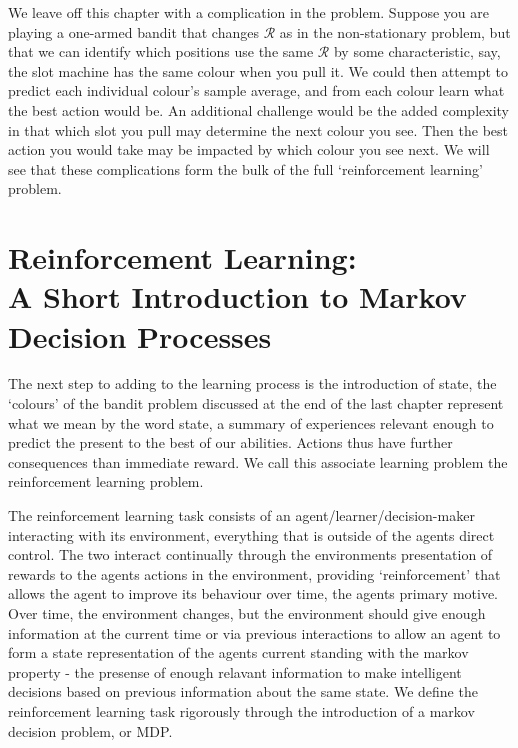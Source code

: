 We leave off this chapter with a complication in the problem. Suppose you are playing a one-armed bandit that changes $\mathcal{R}$ as in the non-stationary problem, but that we can identify which positions use the same $\mathcal{R}$ by some characteristic, say, the slot machine has the same colour when you pull it. We could then attempt to predict each individual colour's sample average, and from each colour learn what the best action would be. An additional challenge would be the added complexity in that which slot you pull may determine the next colour you see. Then the best action you would take may be impacted by which colour you see next. We will see that these complications form the bulk of the full `reinforcement learning' problem.

\chapter{Reinforcement Learning:\\A Short Introduction to Markov Decision Processes}

The next step to adding to the learning process is the introduction of state, the `colours' of the bandit problem discussed at the end of the last chapter represent what we mean by the word state, a summary of experiences relevant enough to predict the present to the best of our abilities. Actions thus have further consequences than immediate reward. We call this associate learning problem the reinforcement learning problem.

The reinforcement learning task consists of an agent/learner/decision-maker interacting with its environment, everything that is outside of the agents direct control. The two interact continually through the environments presentation of rewards to the agents actions in the environment, providing `reinforcement' that allows the agent to improve its behaviour over time, the agents primary motive. Over time, the environment changes, but the environment should give enough information at the current time or via previous interactions to allow an agent to form a state representation of the agents current standing with the markov property - the presense of enough relavant information to make intelligent decisions based on previous information about the same state. We define the reinforcement learning task rigorously through the introduction of a markov decision problem, or MDP.

